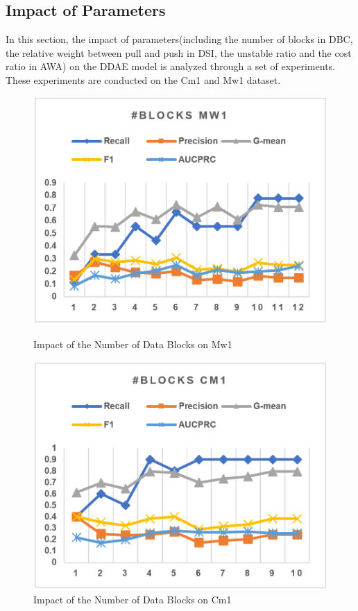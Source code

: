 \subsection{Impact of Parameters}
In this section, the impact of parameters(including the number of blocks in DBC, the relative weight between pull and push in DSI, the unstable ratio and the cost ratio in AWA) on the DDAE model is analyzed through a set of experiments. These experiments are conducted on the Cm1 and Mw1 dataset.

\begin{figure}[h]
    \centering 
    \begin{minipage}{0.45\textwidth}
        \includegraphics[width=\textwidth]{images/fig30}
        \caption{Impact of the Number of Data Blocks on Mw1}
        \label{fig30}
    \end{minipage}
    \quad
    \begin{minipage}{0.45\textwidth}
        \includegraphics[width=\textwidth]{images/fig31}
        \caption{Impact of the Number of Data Blocks on Cm1}
        \label{fig31}
    \end{minipage}
\end{figure}


